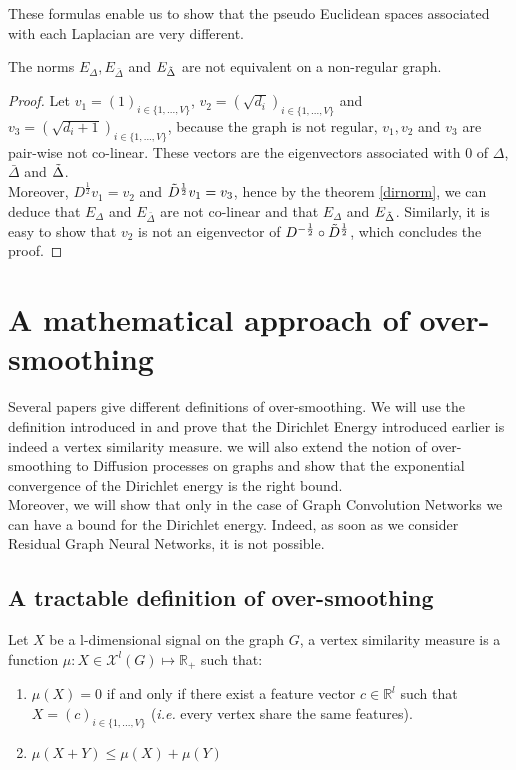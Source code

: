 \documentclass[12pt]{article}
\begin{document}
These formulas enable us to show that the pseudo Euclidean spaces associated with each Laplacian are very different.
\begin{thm}
    The norms $E_{\Delta}, E_{\bar{\Delta}}$ and $E_{\Tilde{\Delta}}$ are not equivalent on a non-regular graph.
\end{thm}

\begin{proof}
    Let $v_1 = (1)_{i \in \{1,...,V\}}$, $v_2 = (\sqrt{d_i})_{i \in \{1,...,V\}}$ and $v_3 = (\sqrt{d_i +1})_{i \in \{1,...,V\}}$, because the graph is not regular, $v_1, v_2$ and $v_3$ are pair-wise not co-linear. These vectors are the eigenvectors associated with $0$ of $\Delta$, $\bar{\Delta}$ and $\Tilde{\Delta}$.\\
    Moreover, $D^{\frac{1}{2}}v_1 = v_2$ and $\Tilde{D}^{\frac{1}{2}}v_1 = v_3$, hence by the theorem \ref{dirnorm}, we can deduce that $E_{\Delta}$ and $E_{\bar{\Delta}}$ are not co-linear and that $E_{\Delta}$ and $E_{\Tilde{\Delta}}$. Similarly, it is easy to show that $v_2$ is not an eigenvector of  $D^{- \frac{1}{2}} \circ \Tilde{D}^{\frac{1}{2}}$, which concludes the proof.
\end{proof}


\newpage
\section{A mathematical approach of over-smoothing}
Several papers give different definitions of over-smoothing. We will use the definition introduced in  and prove that the Dirichlet Energy introduced earlier is indeed a vertex similarity measure. we will also extend the notion of over-smoothing to Diffusion processes on graphs and show that the exponential convergence of the Dirichlet energy is the right bound.\\

Moreover, we will show that only in the case of Graph Convolution Networks we can have a bound for the Dirichlet energy. Indeed, as soon as we consider Residual Graph Neural Networks, it is not possible. 

\subsection{A tractable definition of over-smoothing}

\begin{definition}
    Let $X$ be a l-dimensional signal on the graph $G$, a vertex similarity measure is a function $\mu: X \in \mathcal{X}^l(G) \mapsto \mathbb{R}_+$ such that:
    \begin{enumerate}
        \item $\mu(X) = 0$ if and only if there exist a feature vector $c \in \mathbb{R}^l$ such that $X = (c)_{i \in \{1,...,V\}}$ (\textit{i.e.} every vertex share the same features).
        \item  $\mu(X+Y) \leq \mu(X) + \mu(Y)$
    \end{enumerate}
\end{definition}
\end{document}
